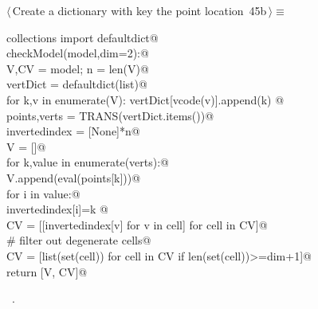 \documentclass[11pt,oneside]{article}    %
\begin{document}
\begin{flushleft} \small \label{scrap73}
\protect{}$\langle\,$Create a dictionary with key the point location\nobreak\ {\footnotesize 45b}$\,\rangle\equiv$
\vspace{-1ex}
\begin{list}{}{} \item
\mbox{}\verb@from collections import defaultdict@\\
\mbox{}\verb@def checkModel(model,dim=2):@\\
\mbox{}\verb@    V,CV = model; n = len(V)@\\
\mbox{}\verb@    vertDict = defaultdict(list)@\\
\mbox{}\verb@    for k,v in enumerate(V): vertDict[vcode(v)].append(k) @\\
\mbox{}\verb@    points,verts = TRANS(vertDict.items())@\\
\mbox{}\verb@    invertedindex = [None]*n@\\
\mbox{}\verb@    V = []@\\
\mbox{}\verb@    for k,value in enumerate(verts):@\\
\mbox{}\verb@        V.append(eval(points[k]))@\\
\mbox{}\verb@        for i in value:@\\
\mbox{}\verb@            invertedindex[i]=k    @\\
\mbox{}\verb@    CV = [[invertedindex[v] for v in cell] for cell in CV]@\\
\mbox{}\verb@    # filter out degenerate cells@\\
\mbox{}\verb@    CV = [list(set(cell)) for cell in CV if len(set(cell))>=dim+1]@\\
\mbox{}\verb@    return [V, CV]@\\
\mbox{}\verb@@{\NWsep}
\end{list}
\vspace{-1ex}
\footnotesize\addtolength{\baselineskip}{-1ex}
\begin{list}{}{\setlength{\itemsep}{-\parsep}\setlength{\itemindent}{-\leftmargin}}
\item \NWtxtMacroRefIn\ .
\end{list}
\end{flushleft}
\end{document}
